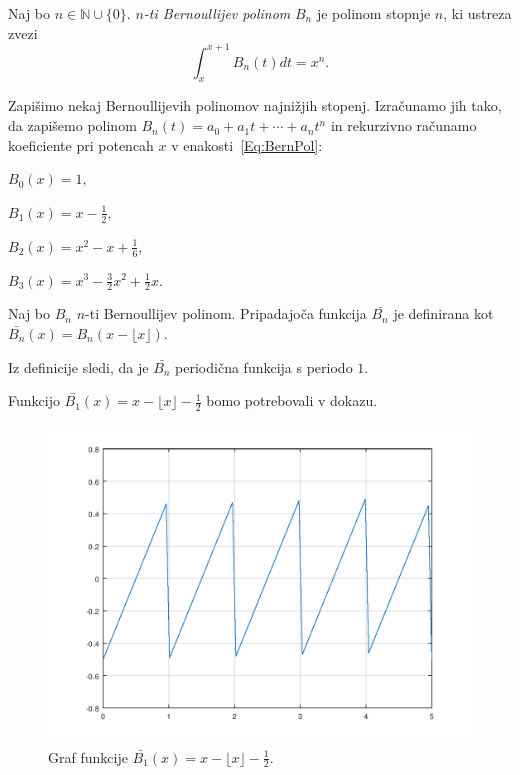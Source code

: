 \documentclass[mat1]{fmfdelo}
\begin{document}
\begin{definicija}
Naj bo $n \in \mathbb{N} \cup \{0\}.$ \emph{$n$-ti Bernoullijev polinom} $B_{n}$ je polinom stopnje $n$, ki ustreza zvezi
\begin{equation}
\label{Eq:BernPol}
\int_{x}^{x+1} B_{n}(t) dt = x^{n}.
\end{equation}
\end{definicija}

\begin{primer}
Zapišimo nekaj Bernoullijevih polinomov najnižjih stopenj. Izračunamo jih tako, da zapišemo polinom $B_{n}(t) = a_{0} + a_{1}t + \cdots + a_{n}t^{n}$ in rekurzivno računamo koeficiente pri potencah $x$ v enakosti~\eqref{Eq:BernPol}:

\( B_{0}(x) = 1, \)

\( B_{1}(x) = x - \frac{1}{2}, \)

\( B_{2}(x) = x^2 - x + \frac{1}{6}, \)

\( B_{3}(x) = x^3 - \frac{3}{2} x^2 + \frac{1}{2} x. \)
\end{primer}

\begin{definicija}
Naj bo $B_{n}$ $n$-ti Bernoullijev polinom. Pripadajoča funkcija $ \bar{B_{n}} $ je definirana kot $ \bar{B_{n}}(x) = B_{n}(x - \lfloor x \rfloor). $
\end{definicija}

\begin{opomba}
Iz definicije sledi, da je $ \bar{B_{n}} $ periodična funkcija s periodo $1$.
\end{opomba}

\begin{primer}
Funkcijo $ \bar{B_{1}}(x) = x - \lfloor x \rfloor - \frac{1}{2} $ bomo potrebovali v dokazu.
\end{primer}

\begin{figure}[h!]
\begin{center}
\includegraphics[scale=0.45]{bernoulli.png}
\caption{Graf funkcije $ \bar{B_{1}}(x) = x - \lfloor x \rfloor - \frac{1}{2} $.}
\end{center}
\end{figure}
\end{document}
